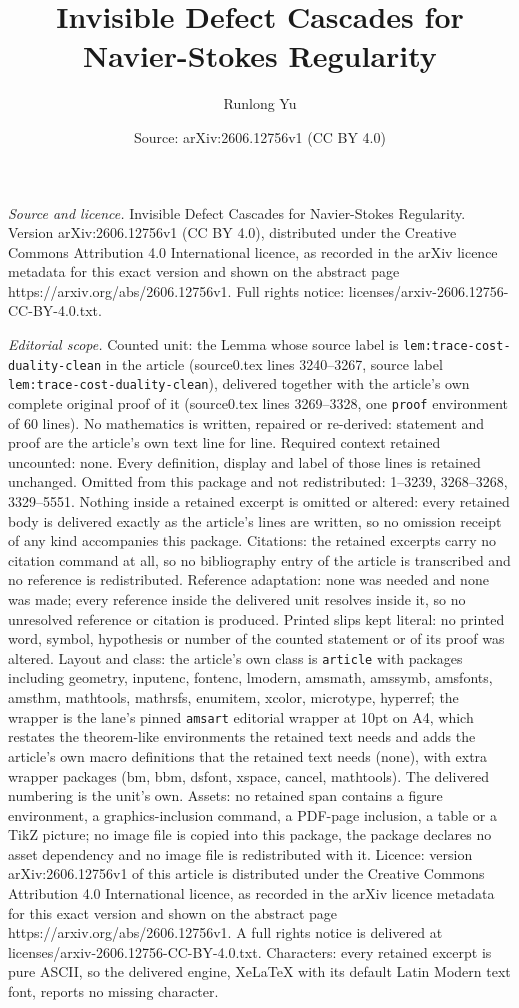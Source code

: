 \documentclass[10pt,a4paper]{amsart}
\title[Invisible Defect Cascades for Navier-Stokes Regularity]{Invisible Defect Cascades for Navier-Stokes Regularity}
\author{Runlong Yu}
\date{Source: arXiv:2606.12756v1 (CC BY 4.0)}
\begin{document}
\maketitle

\noindent\emph{Source and licence.} Invisible Defect Cascades for Navier-Stokes Regularity. Version arXiv:2606.12756v1 (CC BY 4.0), distributed under the Creative Commons Attribution 4.0 International licence, as recorded in the arXiv licence metadata for this exact version and shown on the abstract page https://arxiv.org/abs/2606.12756v1. Full rights notice: licenses/arxiv-2606.12756-CC-BY-4.0.txt.\par\smallskip

\noindent\textit{Editorial scope.} Counted unit: the Lemma whose source label is \texttt{lem:trace-cost-duality-clean} in the article (source0.tex lines 3240--3267, source label \texttt{lem:trace-cost-duality-clean}), delivered together with the article's own complete original proof of it (source0.tex lines 3269--3328, one \texttt{proof} environment of 60 lines). No mathematics is written, repaired or re-derived: statement and proof are the article's own text line for line. Required context retained uncounted: none. Every definition, display and label of those lines is retained unchanged. Omitted from this package and not redistributed: 1--3239, 3268--3268, 3329--5551. Nothing inside a retained excerpt is omitted or altered: every retained body is delivered exactly as the article's lines are written, so no omission receipt of any kind accompanies this package. Citations: the retained excerpts carry no citation command at all, so no bibliography entry of the article is transcribed and no reference is redistributed. Reference adaptation: none was needed and none was made; every reference inside the delivered unit resolves inside it, so no unresolved reference or citation is produced. Printed slips kept literal: no printed word, symbol, hypothesis or number of the counted statement or of its proof was altered. Layout and class: the article's own class is \texttt{article} with packages including geometry, inputenc, fontenc, lmodern, amsmath, amssymb, amsfonts, amsthm, mathtools, mathrsfs, enumitem, xcolor, microtype, hyperref; the wrapper is the lane's pinned \texttt{amsart} editorial wrapper at 10pt on A4, which restates the theorem-like environments the retained text needs and adds the article's own macro definitions that the retained text needs (none), with extra wrapper packages (bm, bbm, dsfont, xspace, cancel, mathtools). The delivered numbering is the unit's own. Assets: no retained span contains a figure environment, a graphics-inclusion command, a PDF-page inclusion, a table or a TikZ picture; no image file is copied into this package, the package declares no asset dependency and no image file is redistributed with it. Licence: version arXiv:2606.12756v1 of this article is distributed under the Creative Commons Attribution 4.0 International licence, as recorded in the arXiv licence metadata for this exact version and shown on the abstract page https://arxiv.org/abs/2606.12756v1. A full rights notice is delivered at licenses/arxiv-2606.12756-CC-BY-4.0.txt. Characters: every retained excerpt is pure ASCII, so the delivered engine, XeLaTeX with its default Latin Modern text font, reports no missing character.
\end{document}
